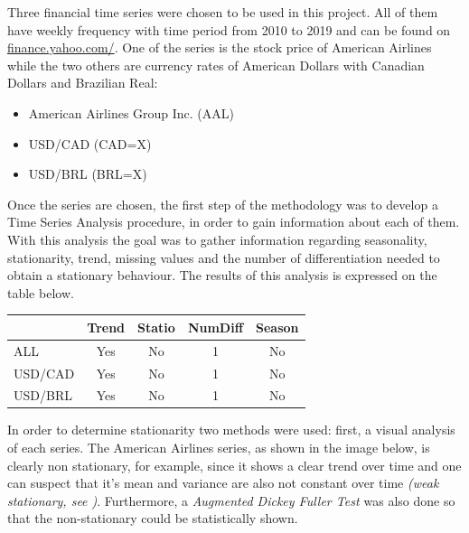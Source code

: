 \documentclass[10pt,twocolumn,letterpaper]{article}
\begin{document}
	Three financial time series were chosen to be used in this project. All of them have weekly frequency with time period from 2010 to 2019 and can be found on \url{finance.yahoo.com/}. One of the series is the stock price of American Airlines while the two others are currency rates of American Dollars with Canadian Dollars and Brazilian Real:
	\begin{itemize}
		\item American Airlines Group Inc. (AAL)
		\item USD/CAD (CAD=X)
		\item USD/BRL (BRL=X)
	\end{itemize}
	
	Once the series are chosen, the first step of the methodology was to develop a Time Series Analysis procedure, in order to gain information about each of them. With this analysis the goal was to gather information regarding seasonality, stationarity, trend, missing values and the number of differentiation needed to obtain a stationary behaviour. The results of this analysis is expressed on the table below.
	
	\begin{table}[h]
		\centering
		\begin{tabular}{|l|c|c|c|c|}
			\hline
			& \multicolumn{1}{l|}{Trend} & \multicolumn{1}{l|}{Statio} & \multicolumn{1}{l|}{NumDiff} & \multicolumn{1}{l|}{Season} \\ \hline
			ALL     & Yes                        & No                              & 1                              & No                            \\ \hline
			USD/CAD & Yes                        & No                              & 1                              & No                            \\ \hline
			USD/BRL & Yes                        & No                              & 1                              & No                            \\ \hline
		\end{tabular}
	\end{table}
	
	In order to determine stationarity two methods were used: first, a visual analysis of each series. The American Airlines series, as shown in the image below, is clearly non stationary, for example, since it shows a clear trend over time and one can suspect that it's mean and variance are also not constant over time \textit{(weak stationary, see \cite{tsay2005analysis})}. Furthermore, a \textit{Augmented Dickey Fuller Test \cite{tsay2005analysis}} was also done so that the non-stationary could be statistically shown. 
	
\end{document}
